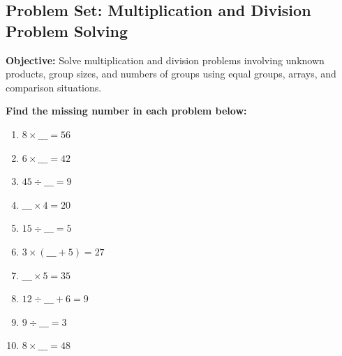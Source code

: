 \documentclass[12pt]{article}
\title{}
\date{}
\begin{document}
\subsection*{Problem Set: Multiplication and Division Problem Solving}
\onehalfspacing

\begin{tcolorbox}[colframe=black!40, colback=gray!5, 
coltitle=black, colbacktitle=black!20, fonttitle=\bfseries\Large, 
title=Learning Objective, halign title=center, left=5pt, right=5pt, top=5pt, bottom=15pt]
\textbf{Objective:} Solve multiplication and division problems involving unknown products, group sizes, and numbers of groups using equal groups, arrays, and comparison situations.
\end{tcolorbox}

\begin{tcolorbox}[colframe=black!60, colback=white, 
coltitle=black, colbacktitle=black!15, fonttitle=\bfseries\Large, 
title=Exercises, halign title=center, left=10pt, right=10pt, top=10pt, bottom=60pt]
\textbf{Find the missing number in each problem below:}
\begin{enumerate}[itemsep=2em]
    \item \(8 \times \_\_\_ = 56\)  
    \item \(6 \times \_\_\_ = 42\)  
    \item \(45 \div \_\_\_ = 9\)  
    \item \(\_\_\_ \times 4 = 20\)  
    \item \(15 \div \_\_\_ = 5\)  
    \item \(3 \times (\_\_\_ + 5) = 27\)  
    \item \(\_\_\_ \times 5 = 35\)  
    \item \(12 \div \_\_\_ + 6 = 9\)  
    \item \(9 \div \_\_\_ = 3\)  
    \item \(8 \times \_\_\_ = 48\)
\end{enumerate}
\end{tcolorbox}
\end{document}
